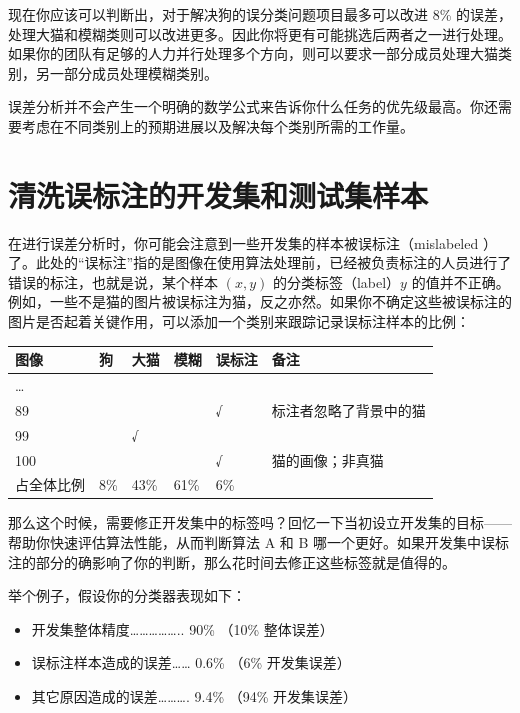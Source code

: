 现在你应该可以判断出，对于解决狗的误分类问题项目最多可以改进 8\%
的误差，处理大猫和模糊类则可以改进更多。因此你将更有可能挑选后两者之一进行处理。如果你的团队有足够的人力并行处理多个方向，则可以要求一部分成员处理大猫类别，另一部分成员处理模糊类别。

误差分析并不会产生一个明确的数学公式来告诉你什么任务的优先级最高。你还需要考虑在不同类别上的预期进展以及解决每个类别所需的工作量。

\hypertarget{ux6e05ux6d17ux8befux6807ux6ce8ux7684ux5f00ux53d1ux96c6ux548cux6d4bux8bd5ux96c6ux6837ux672c}{%
\chapter{清洗误标注的开发集和测试集样本}\label{ux6e05ux6d17ux8befux6807ux6ce8ux7684ux5f00ux53d1ux96c6ux548cux6d4bux8bd5ux96c6ux6837ux672c}}

在进行误差分析时，你可能会注意到一些开发集的样本被误标注（mislabeled
）了。此处的``误标注''指的是图像在使用算法处理前，已经被负责标注的人员进行了错误的标注，也就是说，某个样本
\((x,y)\) 的分类标签（label）\(y\)
的值并不正确。例如，一些不是猫的图片被误标注为猫，反之亦然。如果你不确定这些被误标注的图片是否起着关键作用，可以添加一个类别来跟踪记录误标注样本的比例：

\begin{longtable}[]{@{}llllll@{}}
\toprule
图像 & 狗 & 大猫 & 模糊 & 误标注 & 备注 \\
\midrule
\endhead
\ldots{} & & & & & \\
89 & & & & √ & 标注者忽略了背景中的猫 \\
99 & & √ & & & \\
100 & & & & √ & 猫的画像；非真猫 \\
占全体比例 & 8\% & 43\% & 61\% & 6\% & \\
\bottomrule
\end{longtable}

那么这个时候，需要修正开发集中的标签吗？回忆一下当初设立开发集的目标------帮助你快速评估算法性能，从而判断算法
A 和 B
哪一个更好。如果开发集中误标注的部分的确影响了你的判断，那么花时间去修正这些标签就是值得的。

举个例子，假设你的分类器表现如下：

\begin{itemize}
\tightlist
\item
  开发集整体精度\ldots\ldots\ldots\ldots\ldots.. 90\% （10\% 整体误差）
\item
  误标注样本造成的误差\ldots\ldots{} 0.6\% （6\% 开发集误差）
\item
  其它原因造成的误差\ldots\ldots\ldots. 9.4\% （94\% 开发集误差）
\end{itemize}

